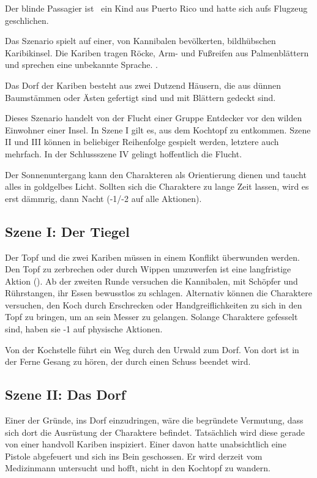 {		\noindent
		Der blinde Passagier ist \zB~ein Kind aus Puerto Rico und hatte sich aufs Flugzeug geschlichen.


		\noindent
		Das Szenario spielt auf einer, von Kannibalen bevölkerten, bildhübschen Karibikinsel. Die Kariben tragen Röcke, Arm- und Fußreifen aus Palmenblättern und sprechen eine unbekannte Sprache. .

		Das Dorf der Kariben besteht aus zwei Dutzend Häusern, die aus dünnen Baumstämmen oder Ästen gefertigt sind und mit Blättern gedeckt sind.


		\noindent
		Dieses Szenario handelt von der Flucht einer Gruppe Entdecker vor den wilden Einwohner einer Insel. In Szene I gilt es, aus dem Kochtopf zu entkommen. Szene II und III können in beliebiger Reihenfolge gespielt werden, letztere auch mehrfach. In der Schlussszene IV gelingt hoffentlich die Flucht.

		Der Sonnenuntergang kann den Charakteren als Orientierung dienen und taucht alles in goldgelbes Licht. Sollten sich die Charaktere zu lange Zeit lassen, wird es erst dämmrig, dann Nacht (-1/-2 auf alle Aktionen).

		\subsection{Szene I: Der Tiegel}

		Der Topf und die zwei Kariben müssen in einem Konflikt überwunden werden. Den Topf zu zerbrechen oder durch Wippen umzuwerfen ist eine langfristige Aktion (). Ab der zweiten Runde versuchen die Kannibalen, mit Schöpfer und Rührstangen, ihr Essen bewusstlos zu schlagen. Alternativ können die Charaktere versuchen, den Koch durch Erschrecken oder Handgreiflichkeiten zu sich in den Topf zu bringen, um an sein Messer zu gelangen. Solange Charaktere gefesselt sind, haben sie -1 auf physische Aktionen.

		Von der Kochstelle führt ein Weg durch den Urwald zum Dorf. Von dort ist in der Ferne Gesang zu hören, der durch einen Schuss beendet wird.

		\subsection{Szene II: Das Dorf}

		Einer der Gründe, ins Dorf einzudringen, wäre die begründete Vermutung, dass sich dort die Ausrüstung der Charaktere befindet. Tatsächlich wird diese gerade von einer handvoll Kariben inspiziert. Einer davon hatte unabsichtlich eine Pistole abgefeuert und sich ins Bein geschossen. Er wird derzeit vom Medizinmann untersucht und hofft, nicht in den Kochtopf zu wandern.

}
